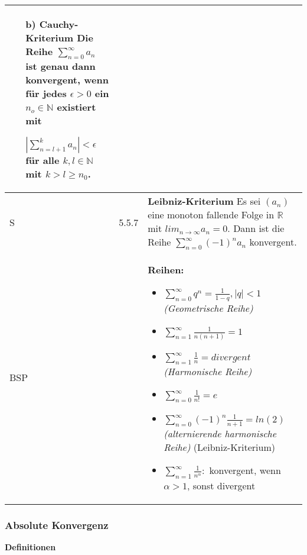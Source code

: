 \begin{longtable}{p{0.75cm} p{1cm} p{16cm}}
\begin{itemize}[topsep=-0.5cm]
                            \item[b)] \textbf{Cauchy-Kriterium} \hfill \break
                                        Die Reihe $\sum^{\infty}_{n=0} a_n$ ist genau dann konvergent, wenn für jedes $\epsilon > 0$ ein $n_o \in \mathbb{N}$
                                        existiert mit \hfill \break
                                        \centerline{$|\sum^{k}_{n=l+1} a_n| < \epsilon$ für alle $k, l \in \mathbb{N}$ mit $k > l \geq n_0$.}
                        \end{itemize} \vspace{-0cm} \\
        \midrule
        S   & 5.5.7 &   \textbf{Leibniz-Kriterium} \hfill \break
                        Es sei $(a_n)$ eine monoton fallende Folge in $\mathbb{R}$ mit $lim_{n \rightarrow \infty} a_n = 0$. Dann ist die 
                        Reihe $\sum^{\infty}_{n=0} (-1)^n a_n$ konvergent. \\
        \midrule
        BSP &      &    \textbf{Reihen:}
                        \begin{itemize}[topsep=-0.5cm]
                            \item $\sum^{\infty}_{n=0} q^n = \frac{1}{1-q}, |q| < 1$ \textit{(Geometrische Reihe)}
                            \item $\sum^{\infty}_{n=1} \frac{1}{n(n+1)} = 1$
                            \item $\sum^{\infty}_{n=1} \frac{1}{n} = divergent$ \textit{(Harmonische Reihe)}
                            \item $\sum^{\infty}_{n=0} \frac{1}{n!} = e$
                            \item $\sum^{\infty}_{n=0} (-1)^n \frac{1}{n+1} = ln(2)$ \textit{(alternierende harmonische Reihe)} (Leibniz-Kriterium)
                            \item $\sum^{\infty}_{n=1} \frac{1}{n^{\alpha}}:$ konvergent, wenn $\alpha > 1$, sonst divergent
                        \end{itemize} \vspace{-0cm} \\
        \bottomrule

    \end{longtable}

\subsubsection{Absolute Konvergenz}
    \noindent
    \textbf{Definitionen}
      
